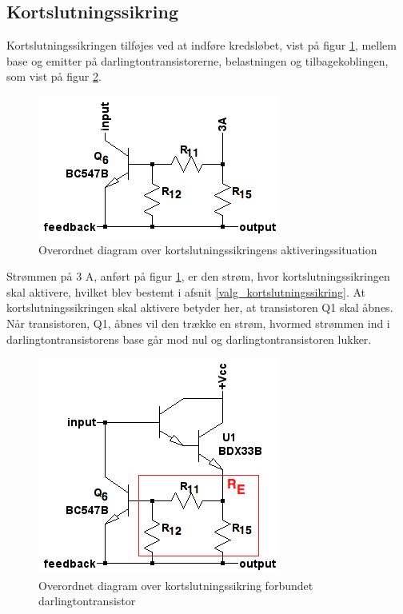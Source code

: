 \subsection{Kortslutningssikring}
\label{effekt_kortslutningssikring}
Kortslutningssikringen tilføjes ved at indføre kredsløbet, vist på figur \ref{fig:dia-kortslut}, mellem base og emitter på darlingtontransistorerne, belastningen og tilbagekoblingen, som vist på figur \ref{fig:dia-kortslut1}. 

\begin{figure}[h]
\centering
\includegraphics[scale=0.5]{teknisk/effektforstaerker/diagram-kortslut.png}
\caption{Overordnet diagram over kortslutningssikringens aktiveringssituation}
\label{fig:dia-kortslut}
\end{figure}

Strømmen på 3 A, anført på figur \ref{fig:dia-kortslut}, er den strøm, hvor kortslutningssikringen skal aktivere, hvilket blev bestemt i afsnit \ref{valg_kortslutningssikring}. At kortslutningssikringen skal aktivere betyder her, at transistoren Q1 skal åbnes. Når transistoren, Q1, åbnes vil den trække en strøm, hvormed strømmen ind i darlingtontransistorens base går mod nul og darlingtontransistoren lukker. 


\begin{figure}[h]
\centering
\includegraphics[scale=0.5]{teknisk/effektforstaerker/diagram-kortslut1.png}
\caption{Overordnet diagram over kortslutningssikring forbundet darlingtontransistor}
\label{fig:dia-kortslut1}
\end{figure}

